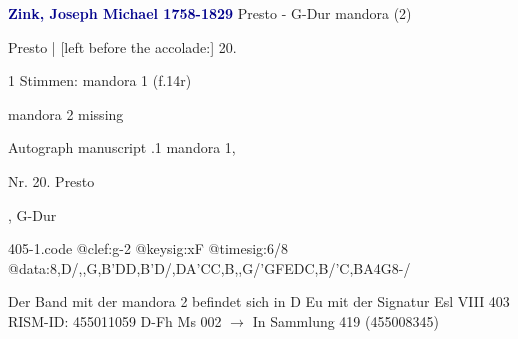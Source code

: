 \documentclass[twocolumn]{book}
\begin{document}
\newline \par \vspace{7pt} \textcolor{darkblue}{\textbf{Zink, Joseph Michael  1758-1829}}
\newline Presto - G-Dur
\newline mandora (2)
\newline \begin{itshape}[f.14r, at left:] Presto | [left before the accolade:] 20.\end{itshape} 
\newline \textcolor{darkblue}{}  1 Stimmen: mandora 1  (f.14r)
\newline \begin{small} mandora 2 missing\end{small} 
\newline Autograph manuscript
.1  mandora 1, \begin{itshape}Nr. 20. Presto\end{itshape}, G-Dur  
\begin{filecontents*}{405-1.code}
@clef:g-2
@keysig:xF
@timesig:6/8
@data:8,D/,,G,B'DD,B'D/,DA'CC,B,,G/{'GFE}{DC,B}/'C,BA4G8-/
\end{filecontents*}
\newline
%
\newline Der Band mit der mandora 2 befindet sich in D Eu mit der Signatur Esl VIII 403
\newline RISM-ID: 455011059
\newline D-Fh  Ms 002
\newline $\rightarrow$ In Sammlung 419 (455008345)
      
\end{document}
